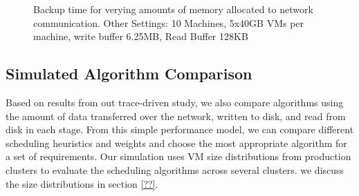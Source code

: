 \begin{figure}[ht]
  \centering
  \caption{Backup time for verying amounts of memory allocated to network communication. Other Settings: 10 Machines, 5x40GB VMs per machine, write buffer 6.25MB, Read Buffer 128KB}
  \label{fig:mpibuf-mem}
\end{figure}


\subsection{Simulated Algorithm Comparison}

Based on results from out trace-driven study, we also compare algorithms using
the amount of data transferred over the network, written to disk, and read from
disk in each stage. From this simple performance model, we can compare
different scheduling heuristics and weights and choose the most appropriate
algorithm for a set of requirements. Our simulation uses VM size distributions
from production clusters to evaluate the scheduling algorithms across several
clusters. we discuss the size distributions in section \ref{??}.


